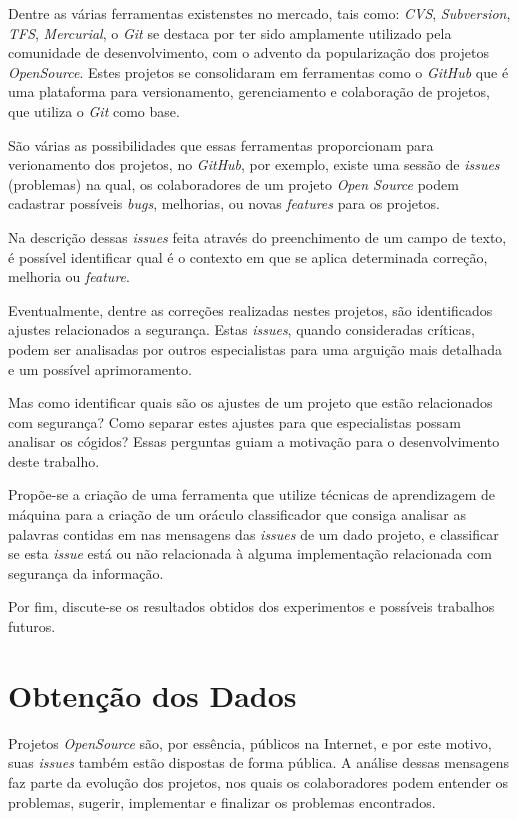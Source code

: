 \documentclass[conference]{IEEEtran}
\begin{document}
Dentre as várias ferramentas existenstes no mercado, tais como: \textit{CVS}, \textit{Subversion}, \textit{TFS}, \textit{Mercurial}, o \textit{Git} se destaca por ter sido amplamente utilizado pela comunidade de desenvolvimento, com o advento da popularização dos projetos \textit{OpenSource}. Estes projetos se consolidaram em ferramentas como o \textit{GitHub} que é uma plataforma para versionamento, gerenciamento e colaboração de projetos, que utiliza o \textit{Git} como base. \cite{Scott:ProGit}

São várias as possibilidades que essas ferramentas proporcionam para verionamento dos projetos, no \textit{GitHub}, por exemplo, existe uma sessão de \textit{issues} (problemas) na qual, os colaboradores de um projeto \textit{Open Source} podem cadastrar possíveis \textit{bugs}, melhorias, ou novas \textit{features} para os projetos.

Na descrição dessas \textit{issues} feita através do preenchimento de um campo de texto, é possível identificar qual é o contexto em que se aplica determinada correção, melhoria ou \textit{feature}.

Eventualmente, dentre as correções realizadas nestes projetos, são identificados ajustes relacionados a segurança. Estas \textit{issues}, quando consideradas críticas, podem ser analisadas por outros especialistas para uma arguição mais detalhada e um possível aprimoramento.

Mas como identificar quais são os ajustes de um projeto que estão relacionados com segurança? Como separar estes ajustes para que especialistas possam analisar os cógidos? Essas perguntas guiam a motivação para o desenvolvimento deste trabalho.

Propõe-se a criação de uma ferramenta que utilize técnicas de aprendizagem de máquina para a criação de um oráculo classificador que consiga analisar as palavras contidas em nas mensagens das \textit{issues} de um dado projeto, e classificar se esta \textit{issue} está ou não relacionada à alguma implementação relacionada com segurança da informação.

Por fim, discute-se os resultados obtidos dos experimentos e possíveis trabalhos futuros.

\section{Obtenção dos Dados}

Projetos \textit{OpenSource} são, por essência, públicos na Internet, e por este motivo, suas \textit{issues} também estão dispostas de forma pública. A análise dessas mensagens faz parte da evolução dos projetos, nos quais os colaboradores podem entender os problemas, sugerir, implementar e finalizar os problemas encontrados.
\end{document}

